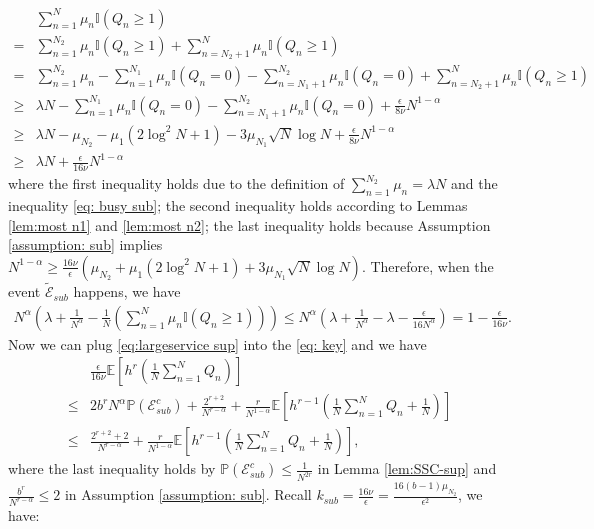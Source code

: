 \documentclass[11pt,oneside,letter]{article}
\begin{document}
\begin{align}
&\sum_{n=1}^{N} \mu_n \mathbb{I}(Q_n\geq 1) \nonumber\\
=&\sum_{n=1}^{N_2} \mu_n \mathbb{I}(Q_n\geq 1)+\sum_{n=N_2+1}^{N} \mu_n \mathbb{I}(Q_n\geq 1) \nonumber\\ 
= &\sum_{n=1}^{N_2} \mu_n - \sum_{n=1}^{N_1} \mu_n\mathbb{I}(Q_n=0) -\sum_{n=N_1+1}^{N_2} \mu_n\mathbb{I}(Q_n=0)+\sum_{n=N_2+1}^{N} \mu_n \mathbb{I}(Q_n\geq 1) \nonumber\\
\geq &  \lambda N -\sum_{n=1}^{N_1} \mu_n\mathbb{I}(Q_n=0) -\sum_{n=N_1+1}^{N_2} \mu_n\mathbb{I}(Q_n=0) +\frac{\epsilon}{8\nu} N^{{1-\alpha}} \nonumber\\
\geq &  \lambda N -\mu_{N_2} -   \mu_1 \left(2\log^2 N +1\right)- 3\mu_{N_1}\sqrt{N}\log N+\frac{\epsilon}{8\nu} N^{{1-\alpha}} \nonumber\\
\geq &  \lambda N +\frac{\epsilon}{16\nu}N^{{1-\alpha}} 
\end{align} where the first inequality holds due to the definition of $\sum_{n=1}^{N_2}\mu_n = \lambda N$ and the inequality \eqref{eq: busy sub}; the second inequality holds according to Lemmas \ref{lem:most n1} and \ref{lem:most n2}; 
the last inequality holds because {Assumption \ref{assumption: sub} implies $N^{1-\alpha} \geq \frac{16\nu}{\epsilon}(\mu_{N_2} + \mu_1 \left(2\log^2 N +1\right) + 3\mu_{N_1}\sqrt{N}\log N)$.} Therefore, when the event $\tilde{\mathcal E}_{sub}$ happens, we have 
\begin{align}
N^{\alpha} \left({\lambda} + \frac{1}{N^{\alpha}}-\frac{1}{N}\left(\sum_{n=1}^{N} \mu_n \mathbb{I}(Q_n\geq 1)\right)\right) 
\leq   N^{\alpha}  \left( \lambda + \frac{1}{N^\alpha} - \lambda - \frac{\epsilon}{16N^{\alpha} } \right) 
=1-\frac{\epsilon}{16\nu}. \label{eq:largeservice sup}
\end{align}
Now we can plug \eqref{eq:largeservice sup} into the \eqref{eq: key} and we have 
\begin{align}
&\frac{\epsilon}{16\nu}\mathbb{E}\left[h^r\left(\frac{1}{N}\sum_{n=1}^{N} Q_n\right)\right]\nonumber\\
\leq 
&2b^r N^{\alpha}\mathbb P\left(\mathcal E_{sub}^c\right)+\frac{2^{r+2}}{ N^{r-\alpha}}+\frac{r}{N^{1-\alpha}} \mathbb{E}\left[{h^{r-1}}\left(\frac{1}{N}\sum_{n=1}^{N} Q_n +{\frac{1}{N}}\right)\right]\nonumber\\
\leq& \frac{2^{r+2}+2}{ N^{r-\alpha}}+\frac{r}{N^{1-\alpha}} \mathbb{E}\left[{h^{r-1}}\left(\frac{1}{N}\sum_{n=1}^{N} Q_n +{\frac{1}{N}}\right)\right],\nonumber
\end{align}
{where the last inequality holds by $\mathbb P(\mathcal E_{sub}^c) \leq \frac{1}{N^{2r}}$ in Lemma \ref{lem:SSC-sup} and $\frac{b^r}{N^{r-\alpha}} \leq 2$ in Assumption \ref{assumption: sub}.}
Recall $k_{sub} = \frac{16\nu}{\epsilon}=\frac{16(b - 1)\mu_{N_2}}{\epsilon^2}$, we have:
\end{document}
